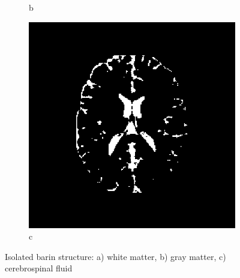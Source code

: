 \begin{figure}[H]
\begin{subfigure}[b]{0.25\linewidth}
		\caption{b}
	\end{subfigure}
	\begin{subfigure}[b]{0.25\linewidth}
		\includegraphics[width=\linewidth]{figures/Module_09/m09_9}
		\caption{c}
	\end{subfigure}
	\caption{Isolated barin structure: a) white matter, b) gray matter, c) cerebrospinal fluid} 
	\label{fig:figures/m09_8910}
\end{figure} 